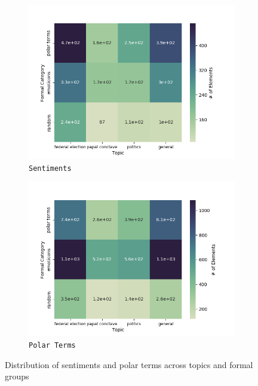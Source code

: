 \begin{figure}[htbp!]
{
\centering
\begin{subfigure}{.5\textwidth}
  \centering
  \includegraphics[width=\linewidth]{img/sentiment_stat.png}
  \caption{\texttt{Sentiments}}\label{snt:fig:crp-sent-emo-distr-a}
\end{subfigure}%
\begin{subfigure}{.5\textwidth}
  \centering
  \includegraphics[width=\linewidth]{img/emo-expression_stat.png}
  \caption{\texttt{Polar Terms}}\label{snt:fig:crp-sent-emo-distr-b}
\end{subfigure}
}
\caption{Distribution of sentiments and polar terms across topics and
  formal groups}\label{snt:fig:crp-sent-emo-distr}
\end{figure}


